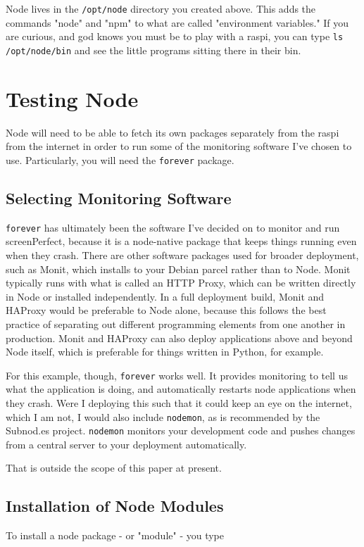 Node lives in the \texttt{/opt/node} directory you created above. This adds the commands "node" and "npm" to what are called "environment variables." If you are curious, and god knows you must be to play with a raspi, you can type \texttt{ls /opt/node/bin} and see the little programs sitting there in their bin.

\section{Testing Node}
Node will need to be able to fetch its own packages separately from the raspi from the internet in order to run some of the monitoring software I've chosen to use. Particularly, you will need the \texttt{forever} package.

\subsection{Selecting Monitoring Software}
\texttt{forever} has ultimately been the software I've decided on to monitor and run screenPerfect, because it is a node-native package that keeps things running even when they crash. There are other software packages used for broader deployment, such as Monit, which installs to your Debian parcel rather than to Node. Monit typically runs with what is called an HTTP Proxy, which can be written directly in Node or installed independently. In a full deployment build, Monit and HAProxy would be preferable to Node alone, because this follows the best practice of separating out different programming elements from one another in production. Monit and HAProxy can also deploy applications above and beyond Node itself, which is preferable for things written in Python, for example. 

For this example, though, \texttt{forever} works well. It provides monitoring to tell us what the application is doing, and automatically restarts node applications when they crash. Were I deploying this such that it could keep an eye on the internet, which I am not, I would also include \texttt{nodemon}, as is recommended by the Subnod.es project. \texttt{nodemon} monitors your development code and pushes changes from a central server to your deployment automatically.

That is outside the scope of this paper at present. 

\subsection{Installation of Node Modules}
To install a node package - or "module" - you type 

